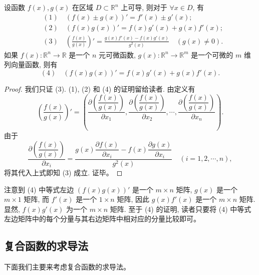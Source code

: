 \documentclass[UTF8,12pt,a4paper,fontset=fandol]{ctexart}
\begin{document}
\begin{theorem}\label{course-theorem-14-2-1}\quad 设函数 $f(x),g(x)$ 在区域 $D\subset\mathbb R^n$ 上可导, 则对于 $\forall x\in D$, 有
\[
\begin{aligned}
  &(1)\quad (f(x)\pm g(x))'=f'(x)\pm g'(x);\\
  &(2)\quad (f(x)g(x))'=f(x)g'(x)+g(x)f'(x);\\
  &(3)\quad \left(\frac{f(x)}{g(x)}\right)'=
  \frac{g(x)f'(x)-f(x)g'(x)}{g^2(x)}\quad (g(x)\ne0).
\end{aligned}
\]
如果 $f(x):\mathbb R^n\to\mathbb R$ 是一个 $n$ 元可微函数, $g(x):\mathbb R^n\to\mathbb R^m$ 是一个可微的 $m$ 维列向量函数, 则有
\[
  (4)\quad (f(x)g(x))'=f(x)g'(x)+g(x)f'(x).
\]

\end{theorem}
\begin{proof}\quad 我们只证 (3). (1), (2) 和 (4) 的证明留给读者. 由定义有
\[
  \left(\frac{f(x)}{g(x)}\right)'=
  \left(
    \frac{\partial\left(\dfrac{f(x)}{g(x)}\right)}{\partial x_1},
    \frac{\partial\left(\dfrac{f(x)}{g(x)}\right)}{\partial x_2},
    \cdots,
    \frac{\partial\left(\dfrac{f(x)}{g(x)}\right)}{\partial x_n}
  \right).
\]
由于
\[
  \frac{\partial\left(\dfrac{f(x)}{g(x)}\right)}{\partial x_i}
  =
  \frac{g(x)\dfrac{\partial f(x)}{\partial x_i}-f(x)\dfrac{\partial g(x)}{\partial x_i}}{g^2(x)}
  \quad (i=1,2,\cdots,n),
\]
将其代入上式即知 (3) 成立. 证毕。

\end{proof}
\begin{remark}\quad 注意到 (4) 中等式左边 $(f(x)g(x))'$ 是一个 $m\times n$ 矩阵, $g(x)$ 是一个 $m\times1$ 矩阵, 而 $f'(x)$ 是一个 $1\times n$ 矩阵, 因此 $g(x)f'(x)$ 是一个 $m\times n$ 矩阵. 显然, $f(x)g'(x)$ 为一个 $m\times n$ 矩阵. 至于 (4) 的证明, 读者只要将 (4) 中等式左边矩阵中的每个分量与其右边矩阵中相对应的分量比较即可。

\end{remark}
\subsection{复合函数的求导法}

下面我们主要来考虑复合函数的求导法。
\end{document}
